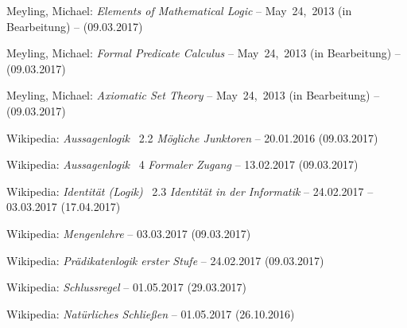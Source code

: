 \begin{flushleft}
\begin{thebibliography}{12}
		Meyling, Michael:
		\emph{Elements of Mathematical Logic}
		-- May~24,~2013 (in Bearbeitung)
		-- (09.03.2017)
		
		Meyling, Michael:
		\emph{Formal Predicate Calculus}
		-- May~24,~2013 (in Bearbeitung)
		-- (09.03.2017)
		
		Meyling, Michael:
		\emph{Axiomatic Set Theory}
		-- May~24,~2013 (in Bearbeitung)
		-- (09.03.2017)
		
		Wikipedia:
		\emph{Aussagenlogik} \chaptername~2.2 \emph{Mögliche Junktoren}
		-- 20.01.2016
		(09.03.2017)
		
		Wikipedia:
		\emph{Aussagenlogik} \chaptername~4 \emph{Formaler Zugang}
		-- 13.02.2017
		(09.03.2017)
		
		Wikipedia:
		\emph{Identität (Logik)} \chaptername~2.3
		\emph{Identität in der Informatik}
		-- 24.02.2017
		-- 03.03.2017 (17.04.2017)
		
		Wikipedia:
		\emph{Mengenlehre}
		-- 03.03.2017
		(09.03.2017)
		
		Wikipedia:
		\emph{Prädikatenlogik erster Stufe}
		-- 24.02.2017
		(09.03.2017)
		
		Wikipedia:
		\emph{Schlussregel}
		-- 01.05.2017
		(29.03.2017)
		
		Wikipedia:
		\emph{Natürliches Schließen}
		-- 01.05.2017
		(26.10.2016)
		
	\end{thebibliography}
\end{flushleft}

\Endchapter
